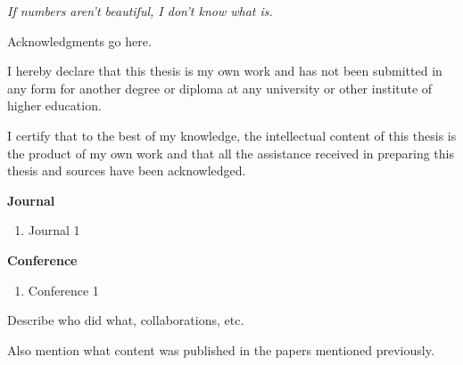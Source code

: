 \documentclass[12pt]{iiscthes}
\begin{document}
\begin{frontmatter}
\begin{center}
\begin{minipage}{.6\textwidth}
\emph{If numbers aren't beautiful, I don't know what is.}

\end{minipage}
\end{center}
\vfill %
\clearpage

\acknowledgements

Acknowledgments go here.

\statementoforiginality

I hereby declare that this thesis is my own work and has not been submitted in any form for another degree or diploma at any university or other institute of higher education.

I certify that to the best of my knowledge, the intellectual content of this thesis is the product of my own work and
that all the assistance received in preparing this thesis and sources have been
acknowledged. 

\publications

{\bf Journal}
\begin{enumerate}
\item[J1] Journal 1
\end{enumerate}
{\bf Conference}
\begin{enumerate}
   \item[C1] Conference 1
\end{enumerate}

\preface

Describe who did what, collaborations, etc.

Also mention what content was published in the papers mentioned previously.
\begin{abstract}
\sl
Abstract here. Limit to around 2 pages.	
\end{abstract}
\newpage
{}


\end{frontmatter}
\end{document}
